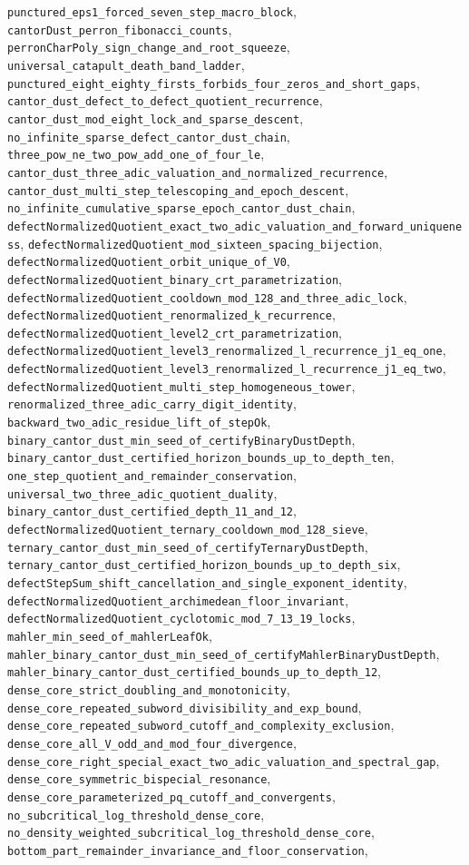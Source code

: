 \documentclass[11pt]{article}
\begin{document}
\begin{enumerate}
\texttt{punctured\_eps1\_forced\_seven\_step\_macro\_block}, \texttt{cantorDust\_perron\_fibonacci\_counts}, \texttt{perronCharPoly\_sign\_change\_and\_root\_squeeze}, \texttt{universal\_catapult\_death\_band\_ladder}, \texttt{punctured\_eight\_eighty\_firsts\_forbids\_four\_zeros\_and\_short\_gaps}, \texttt{cantor\_dust\_defect\_to\_defect\_quotient\_recurrence}, \texttt{cantor\_dust\_mod\_eight\_lock\_and\_sparse\_descent}, \texttt{no\_infinite\_sparse\_defect\_cantor\_dust\_chain}, \texttt{three\_pow\_ne\_two\_pow\_add\_one\_of\_four\_le}, \texttt{cantor\_dust\_three\_adic\_valuation\_and\_normalized\_recurrence}, \texttt{cantor\_dust\_multi\_step\_telescoping\_and\_epoch\_descent}, \texttt{no\_infinite\_cumulative\_sparse\_epoch\_cantor\_dust\_chain}, \texttt{defectNormalizedQuotient\_exact\_two\_adic\_valuation\_and\_forward\_uniqueness}, \texttt{defectNormalizedQuotient\_mod\_sixteen\_spacing\_bijection}, \texttt{defectNormalizedQuotient\_orbit\_unique\_of\_V0}, \texttt{defectNormalizedQuotient\_binary\_crt\_parametrization}, \texttt{defectNormalizedQuotient\_cooldown\_mod\_128\_and\_three\_adic\_lock}, \texttt{defectNormalizedQuotient\_renormalized\_k\_recurrence}, \texttt{defectNormalizedQuotient\_level2\_crt\_parametrization}, \texttt{defectNormalizedQuotient\_level3\_renormalized\_l\_recurrence\_j1\_eq\_one}, \texttt{defectNormalizedQuotient\_level3\_renormalized\_l\_recurrence\_j1\_eq\_two}, \texttt{defectNormalizedQuotient\_multi\_step\_homogeneous\_tower}, \texttt{renormalized\_three\_adic\_carry\_digit\_identity}, \texttt{backward\_two\_adic\_residue\_lift\_of\_stepOk}, \texttt{binary\_cantor\_dust\_min\_seed\_of\_certifyBinaryDustDepth}, \texttt{binary\_cantor\_dust\_certified\_horizon\_bounds\_up\_to\_depth\_ten}, \texttt{one\_step\_quotient\_and\_remainder\_conservation}, \texttt{universal\_two\_three\_adic\_quotient\_duality}, \texttt{binary\_cantor\_dust\_certified\_depth\_11\_and\_12}, \texttt{defectNormalizedQuotient\_ternary\_cooldown\_mod\_128\_sieve}, \texttt{ternary\_cantor\_dust\_min\_seed\_of\_certifyTernaryDustDepth}, \texttt{ternary\_cantor\_dust\_certified\_horizon\_bounds\_up\_to\_depth\_six}, \texttt{defectStepSum\_shift\_cancellation\_and\_single\_exponent\_identity}, \texttt{defectNormalizedQuotient\_archimedean\_floor\_invariant}, \texttt{defectNormalizedQuotient\_cyclotomic\_mod\_7\_13\_19\_locks}, \texttt{mahler\_min\_seed\_of\_mahlerLeafOk}, \texttt{mahler\_binary\_cantor\_dust\_min\_seed\_of\_certifyMahlerBinaryDustDepth}, \texttt{mahler\_binary\_cantor\_dust\_certified\_bounds\_up\_to\_depth\_12}, \texttt{dense\_core\_strict\_doubling\_and\_monotonicity}, \texttt{dense\_core\_repeated\_subword\_divisibility\_and\_exp\_bound}, \texttt{dense\_core\_repeated\_subword\_cutoff\_and\_complexity\_exclusion}, \texttt{dense\_core\_all\_V\_odd\_and\_mod\_four\_divergence}, \texttt{dense\_core\_right\_special\_exact\_two\_adic\_valuation\_and\_spectral\_gap}, \texttt{dense\_core\_symmetric\_bispecial\_resonance}, \texttt{dense\_core\_parameterized\_pq\_cutoff\_and\_convergents}, \texttt{no\_subcritical\_log\_threshold\_dense\_core}, \texttt{no\_density\_weighted\_subcritical\_log\_threshold\_dense\_core}, \texttt{bottom\_part\_remainder\_invariance\_and\_floor\_conservation}, 
\end{enumerate}
\end{document}
